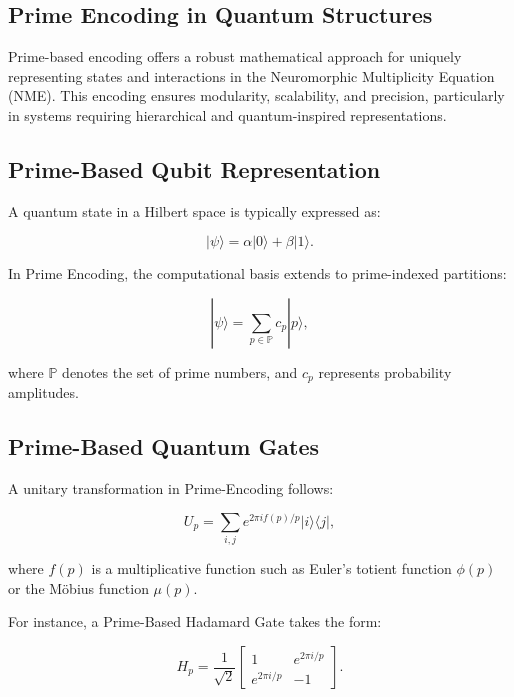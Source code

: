 \documentclass{article}
\theoremstyle{plain}
\begin{document}
\begin{itemize}
\begin{itemize}
\section{Prime Encoding in Quantum Structures}

Prime-based encoding offers a robust mathematical approach for uniquely representing states and interactions in the Neuromorphic Multiplicity Equation (NME). This encoding ensures modularity, scalability, and precision, particularly in systems requiring hierarchical and quantum-inspired representations.

\subsection{Prime-Based Qubit Representation}
A quantum state in a Hilbert space is typically expressed as:

\begin{equation}
|\psi\rangle = \alpha |0\rangle + \beta |1\rangle.
\end{equation}

In Prime Encoding, the computational basis extends to prime-indexed partitions:

\begin{equation}
|\psi\rangle = \sum_{p \in \mathbb{P}} c_p |p\rangle,
\end{equation}

where \( \mathbb{P} \) denotes the set of prime numbers, and \( c_p \) represents probability amplitudes.

\subsection{Prime-Based Quantum Gates}
A unitary transformation in Prime-Encoding follows:

\begin{equation}
U_p = \sum_{i,j} e^{2\pi i f(p) / p} |i\rangle \langle j|,
\end{equation}

where \( f(p) \) is a multiplicative function such as Euler's totient function \( \phi(p) \) or the Möbius function \( \mu(p) \).

For instance, a Prime-Based Hadamard Gate takes the form:

\begin{equation}
H_p = \frac{1}{\sqrt{2}} \begin{bmatrix}
1 & e^{2\pi i / p} \\
e^{2\pi i / p} & -1
\end{bmatrix}.
\end{equation}

\end{itemize}
\end{itemize}
\end{document}
